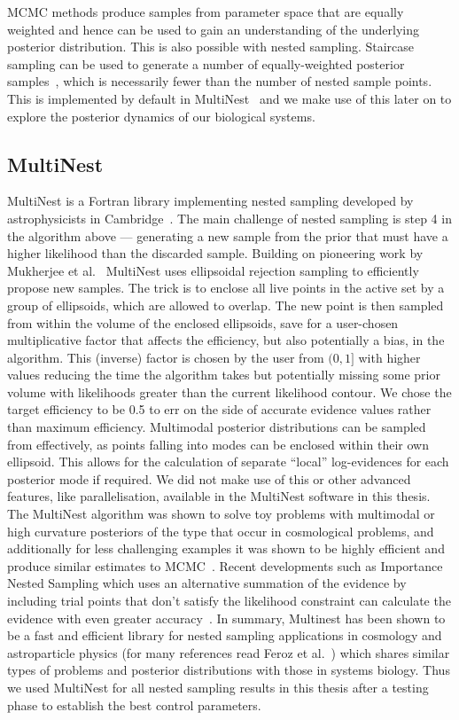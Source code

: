 MCMC methods produce samples from parameter space that are equally weighted and hence can be used to gain an understanding of the underlying posterior distribution.
This is also possible with nested sampling.
Staircase sampling can be used to generate a number of equally-weighted posterior samples~\cite{sivia2006}, which is necessarily fewer than the number of nested sample points.
This is implemented by default in MultiNest~\cite{feroz2009multinest} and we make use of this later on to explore the posterior dynamics of our biological systems.

\subsection{MultiNest}
MultiNest is a Fortran library implementing nested sampling developed by astrophysicists in Cambridge~\cite{feroz2008,feroz2009multinest}.
The main challenge of nested sampling is step 4 in the algorithm above --- generating a new sample from the prior that must have a higher likelihood than the discarded sample.
Building on pioneering work by Mukherjee et al.~\cite{mukherjee2006} MultiNest uses ellipsoidal rejection sampling to efficiently propose new samples.
The trick is to enclose all live points in the active set by a group of ellipsoids, which are allowed to overlap.
The new point is then sampled from within the volume of the enclosed ellipsoids, save for a user-chosen multiplicative factor that affects the efficiency, but also potentially a bias, in the algorithm.
This (inverse) factor is chosen by the user from $(0,1]$ with higher values reducing the time the algorithm takes but potentially missing some prior volume with likelihoods greater than the current likelihood contour. 
We chose the target efficiency to be 0.5 to err on the side of accurate evidence values rather than maximum efficiency.
Multimodal posterior distributions can be sampled from effectively, as points falling into modes can be enclosed within their own ellipsoid.
This allows for the calculation of separate ``local'' log-evidences for each posterior mode if required.
We did not make use of this or other advanced features, like parallelisation, available in the MultiNest software in this thesis.
The MultiNest algorithm was shown to solve toy problems with multimodal or high curvature posteriors of the type that occur in cosmological problems, and additionally for less challenging examples it was shown to be highly efficient and produce similar estimates to MCMC~\cite{feroz2009multinest}.
Recent developments such as Importance Nested Sampling which uses an alternative summation of the evidence by including trial points that don't satisfy the likelihood constraint can calculate the evidence with even greater accuracy~\cite{feroz2013}.
In summary, Multinest has been shown to be a fast and efficient library for nested sampling applications in cosmology and astroparticle physics (for many references read Feroz et al.~\cite{feroz2013}) which shares similar types of problems and posterior distributions with those in systems biology.
Thus we used MultiNest for all nested sampling results in this thesis after a testing phase to establish the best control parameters.

